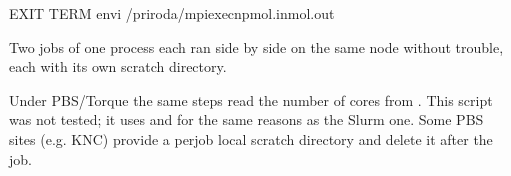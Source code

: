 \documentclass[letterpaper,10pt,english,openany,oneside]{sphinxmanual}
\begin{document}
\begin{sphinxVerbatim}[commandchars=\\\{\}]
EXIT
TERM
env\PYGZhy{}i
/priroda/mpiexec\PYGZhy{}npmol.inmol.out
\end{sphinxVerbatim}



\sphinxAtStartPar
Two jobs of one process each ran side by side on the same node without trouble, each with its own scratch
directory. 

\sphinxAtStartPar
Under PBS/Torque the same steps read the number of cores from . This script was not tested; it
uses  and  for the same reasons as the Slurm one. Some PBS sites (e.g. KNC) provide a
per\sphinxhyphen{}job local scratch directory and delete it after the job.
\end{document}
